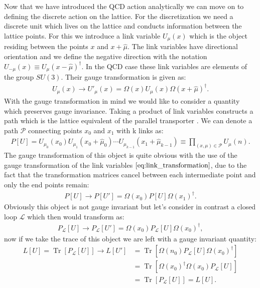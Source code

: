 \documentclass[english,twoside,openright]{UH_TCM_MSc}
\DeclareMathOperator{\Tr}{Tr}
\begin{document}
Now that we have introduced the QCD action analytically we can move on to defining the discrete action on the lattice. For the discretization we need a discrete unit which lives on the lattice and conducts information between the lattice points. For this we introduce a link variable $U_\mu(x)$ which is the object residing between the points $x$ and $x+\hat{\mu}$. The link variables have directional orientation and we define the negative direction with the notation $U_{-\mu}(x) \equiv U_{\mu}(x-\hat{\mu})^\dagger$. In the QCD case these link variables are elements of the group $SU(3)$. Their gauge transformation is given as:
\begin{align}
    U_\mu(x) \rightarrow U'_\mu(x) = \Omega(x) U_\mu(x) \Omega(x+\hat{\mu})^\dagger. \label{eq:link_transformation}
\end{align}
With the gauge transformation in mind we would like to consider a quantity which preserves gauge invariance. Taking a product of link variables constructs a path which is the lattice equivalent of the parallel transporter \cite[ch. 4.3]{Smit:2002ug}. We can denote a path $\mathcal{P}$ connecting points $x_0$ and $x_1$ with k links as:
\begin{align}
    P[U] = U_{\mu_0}(x_0) U_{\mu_1}(x_0+\hat{\mu}_0)\cdots U_{\mu_{k-1}}(x_1+\hat{\mu}_{k-1}) \equiv \prod_{(x,\mu) \in \mathcal{P}} U_\mu(n).
\end{align}
The gauge transformation of this object is quite obvious with the use of the gauge transformation of the link variables $\ref{eq:link_transformation}$, due to the fact that the transformation matrices cancel between each intermediate point and only the end points remain:
\begin{align}
    P[U] \rightarrow P[U'] = \Omega(x_0)P[U]\Omega(x_1)^\dagger.
\end{align}
Obviously this object is not gauge invariant but let's consider in contrast a closed loop $\mathcal{L}$ which then would transform as:
\begin{align}
    P_\mathcal{L}[U] \rightarrow P_\mathcal{L}[U'] = \Omega(x_0)P_\mathcal{L}[U]\Omega(x_0)^\dagger,
\end{align}
now if we take the trace of this object we are left with a gauge invariant quantity:
\begin{align}
    L[U] = \Tr[P_\mathcal{L}[U]] \rightarrow L[U'] &= \Tr[\Omega(n_0)P_\mathcal{L}[U]\Omega(x_0)^\dagger] \\
    &= \Tr[\Omega(x_0)^\dagger\Omega(x_0)P_\mathcal{L}[U]] \\
    &= \Tr[P_\mathcal{L}[U]] = L[U].
\end{align}
\end{document}
